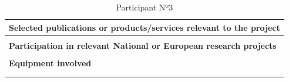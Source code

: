 \begin{longtable}[H]{|p{0.7cm}|p{4cm}|p{7cm}|p{1.3cm}|}
	\multicolumn{4}{|p{13cm}|}{\textbf{Selected publications or products/services relevant to the project}}  \\ \hline
	
	\multicolumn{4}{|p{13cm}|}{}  \\ \hline
	
	\multicolumn{4}{|p{13cm}|}{\textbf{Participation in relevant National or European research projects}}  \\ \hline
	
	\multicolumn{4}{|p{13cm}|}{}  \\ \hline
	
	\multicolumn{4}{|p{13cm}|}{\textbf{Equipment involved}}  \\ \hline
	
	\multicolumn{4}{|p{13cm}|}{}  \\ \hline
	\caption{Participant Nº3}
\end{longtable}

